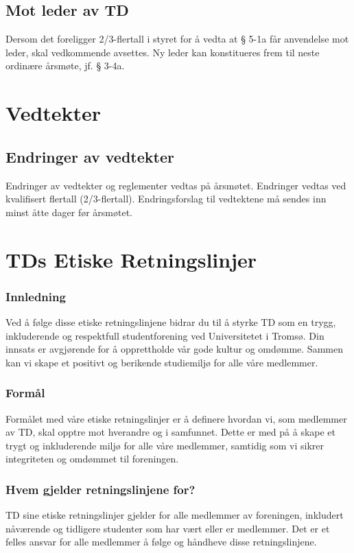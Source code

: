 \documentclass[11pt]{article}
\begin{document}
\subsection{Mot leder av TD}
Dersom det foreligger 2/3-flertall i styret for å vedta at § 5-1a får anvendelse mot leder, skal vedkommende avsettes. Ny leder kan konstitueres frem til neste ordinære årsmøte, jf. § 3-4a.

\section{Vedtekter}
\subsection{Endringer av vedtekter}
Endringer av vedtekter og reglementer vedtas på årsmøtet. Endringer vedtas ved kvalifisert flertall (2/3-flertall). Endringsforslag til vedtektene må sendes inn minst åtte dager før årsmøtet.
\newpage

\renewcommand{\thepage}{}


\appendix
\section{TDs Etiske Retningslinjer}

\subsubsection{Innledning}
Ved å følge disse etiske retningslinjene bidrar du til å styrke TD som en trygg, inkluderende og respektfull studentforening ved Universitetet i Tromsø. Din innsats er avgjørende for å opprettholde vår gode kultur og omdømme. Sammen kan vi skape et positivt og berikende studiemiljø for alle våre medlemmer.
 
\subsubsection{Formål}
Formålet med våre etiske retningslinjer er å definere hvordan vi, som medlemmer av TD, skal opptre mot hverandre og i samfunnet. Dette er med på å skape et trygt og inkluderende miljø for alle våre medlemmer, samtidig som vi sikrer integriteten og omdømmet til foreningen.
 
\subsubsection{Hvem gjelder retningslinjene for?}
TD sine etiske retningslinjer gjelder for alle medlemmer av foreningen, inkludert nåværende og tidligere studenter som har vært eller er medlemmer. Det er et felles ansvar for alle medlemmer å følge og håndheve disse retningslinjene.
 
\end{document}
